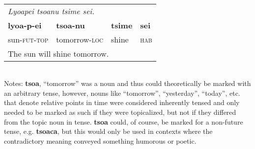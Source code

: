\documentclass{article}
\begin{document}
\\[0.5cm]
\begin{tabular}{l l l l}
\multicolumn{4}{l}{\emph{Lyoapei tsoanu tsime sei.}} \\
\textbf{lyoa-p-ei} & \textbf{tsoa-nu} & \textbf{tsime} & \textbf{sei} \\
sun-\textsc{fut-top} & tomorrow-\textsc{loc} & shine & \textsc{hab} \\
\multicolumn{4}{l}{The sun will shine tomorrow.} \\
\end{tabular}
\\

Notes: \textbf{tsoa}, ``tomorrow'' was a noun and thus could theoretically be marked with an arbitrary tense, however, nouns like ``tomorrow'', ``yesterday'', ``today'', etc. that denote relative points in time were considered inherently tensed and only needed to be marked as such if they were topicalized, but not if they differed from the topic noun in tense.  \textbf{tsoa} could, of course, be marked for a non-future tense, e.g. \textbf{tsoaca}, but this would only be used in contexts where the contradictory meaning conveyed something humorous or poetic.
\end{document}
